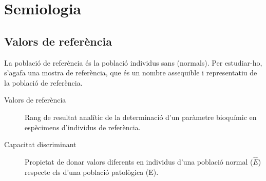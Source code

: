 \section{Semiologia}

\subsection{Valors de referència}
La població de referència és la població individus sans (normals). Per estudiar-ho, s'agafa una mostra de referència, que és un nombre assequible i representatiu de la població de referència.

\begin{description}
\item[Valors de referència] Rang de resultat analític de la determinació d'un paràmetre bioquímic en espècimens d'individus de referència.

\item[Capacitat discriminant] Propietat de donar valors diferents en individus d'una població normal ($\hat{E}$) respecte els d'una població patològica (E).
\end{description}